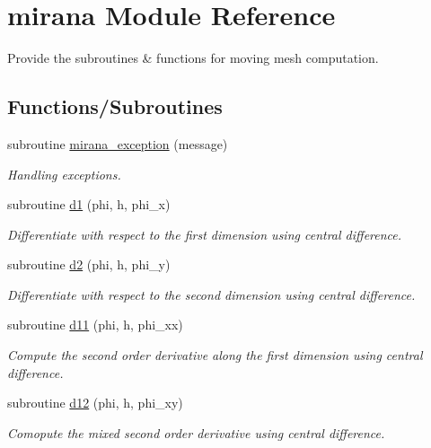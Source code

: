 \hypertarget{namespacemirana}{}\section{mirana Module Reference}
\label{namespacemirana}


Provide the subroutines \& functions for moving mesh computation.  


\subsection*{Functions/\+Subroutines}
\begin{DoxyCompactItemize}
\item 
subroutine \hyperlink{namespacemirana_ab002a22665f70b4c65bdcf70ac96d768}{mirana\+\_\+exception} (message)
\begin{DoxyCompactList}\small\item\em Handling exceptions. \end{DoxyCompactList}\item 
subroutine \hyperlink{namespacemirana_a4009036e8b04ac992641e36d34ab0ed4}{d1} (phi, h, phi\+\_\+x)
\begin{DoxyCompactList}\small\item\em Differentiate with respect to the first dimension using central difference. \end{DoxyCompactList}\item 
subroutine \hyperlink{namespacemirana_a21348ffe170eafc6fc2a009256b1b6e3}{d2} (phi, h, phi\+\_\+y)
\begin{DoxyCompactList}\small\item\em Differentiate with respect to the second dimension using central difference. \end{DoxyCompactList}\item 
subroutine \hyperlink{namespacemirana_ab9b1e7b5e38c6a020e05196b452e6d02}{d11} (phi, h, phi\+\_\+xx)
\begin{DoxyCompactList}\small\item\em Compute the second order derivative along the first dimension using central difference. \end{DoxyCompactList}\item 
subroutine \hyperlink{namespacemirana_ad3ac07295401fa4e0da8c4fa3bcc2cd4}{d12} (phi, h, phi\+\_\+xy)
\begin{DoxyCompactList}\small\item\em Comopute the mixed second order derivative using central difference. \end{DoxyCompactList}\item 

\end{DoxyCompactItemize}
